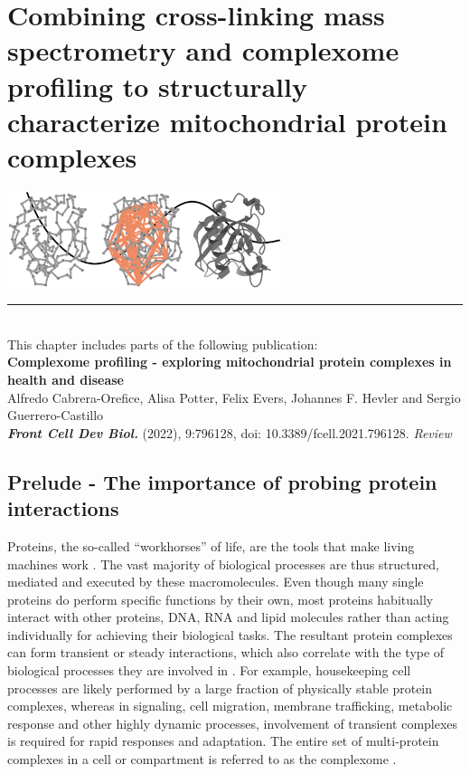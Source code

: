 \chapter{\large Combining cross-linking mass spectrometry and complexome profiling to structurally characterize mitochondrial protein complexes} \label{ch-1}
%
{
    \begin{center}
        \vspace{0.75cm}
        \footnotesize
        \includegraphics[width=0.6\textwidth]{Chapter.1/Figures/chapter1_cover.png}
    \end{center}
}
%
\begin{flushleft}
    \vspace*{\fill}
    \rule{\textwidth}{1pt}\\[0cm]
    This chapter includes parts of the following publication:\\
    \textbf{Complexome profiling - exploring mitochondrial protein complexes in health and disease}\\
    \footnotesize
    \vspace{0.3cm}
    Alfredo Cabrera-Orefice, Alisa Potter, Felix Evers, Johannes F. Hevler and Sergio Guerrero-Castillo \\
    \textbf{\emph{Front Cell Dev Biol.}} (2022), 9:796128, doi: 10.3389/fcell.2021.796128. \emph{Review}\\
\end{flushleft}
\newpage
%
\section{Prelude - The importance of probing protein interactions}
Proteins, the so-called “workhorses” of life, are the tools that make living machines work  \cite{Adams_2008}. The vast majority of biological processes are thus structured, mediated and executed by these macromolecules. Even though many single proteins do perform specific functions by their own, most proteins habitually interact with other proteins, DNA, RNA and lipid molecules rather than acting individually for achieving their biological tasks. The resultant protein complexes can form transient or steady interactions, which also correlate with the type of biological processes they are involved in \cite{De_Las_Rivas_2010}. For example, housekeeping cell processes are likely performed by a large fraction of physically stable protein complexes, whereas in signaling, cell migration, membrane trafficking, metabolic response and other highly dynamic processes, involvement of transient complexes is required for rapid responses and adaptation. The entire set of multi-protein complexes in a cell or compartment is referred to as the complexome \cite{Ceulemans_2006, Deshaies_2002, Lasserre_2006}.

